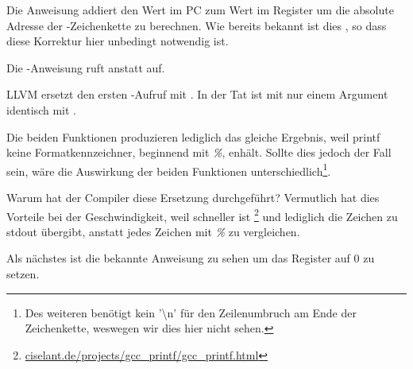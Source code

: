 
Die Anweisung  addiert den Wert im \ac{PC} zum Wert im Register 
um die absolute Adresse der -Zeichenkette zu berechnen.
Wie bereits bekannt ist dies \q{\PICcode}, so dass diese Korrektur hier unbedingt notwendig ist.

Die -Anweisung ruft \puts anstatt \printf auf.

\label{puts}

LLVM ersetzt den ersten \printf-Aufruf mit \puts. In der Tat ist \printf mit nur einem
Argument identisch mit \puts.

Die beiden Funktionen produzieren lediglich das gleiche Ergebnis, weil printf keine
Formatkennzeichner, beginnend mit \emph{\%}, enhält.
Sollte dies jedoch der Fall sein, wäre die Auswirkung der beiden Funktionen
unterschiedlich\footnote{Des weiteren benötigt \puts kein '\textbackslash{}n'
für den Zeilenumbruch am Ende der Zeichenkette, weswegen wir dies hier nicht sehen.}.

Warum hat der Compiler diese Ersetzung durchgeführt? Vermutlich hat dies Vorteile bei
der Geschwindigkeit, weil \puts schneller ist
\footnote{\href{http://go.yurichev.com/17063}{ciselant.de/projects/gcc\_printf/gcc\_printf.html}}
und lediglich die Zeichen zu \gls{stdout} übergibt, anstatt jedes Zeichen mit \emph{\%} zu vergleichen.

Als nächstes ist die bekannte Anweisung  zu sehen um das Register  auf 0 zu setzen.
